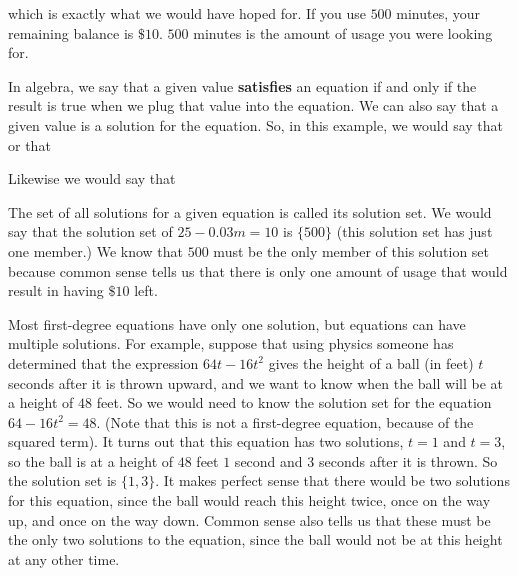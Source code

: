 which is exactly what we would have hoped for. If you use $500$ minutes, your remaining balance is $\$10$. $500$ minutes is the amount of usage you were looking for.

In algebra, we say that a given value \textbf{satisfies}  an equation if and only if the result is true when we plug that value into the equation. We can also say that a given value is a solution for the equation. So, in this example, we would say that  or that 

Likewise we would say that 

The set of all solutions for a given equation is called its solution set. We would say that the solution set of $25 - 0.03m = 10$ is $\{500\}$ (this solution set has just one member.)  We know that $500$ must be the only member of this solution set because common sense tells us that there is only one amount of usage that would result in having $\$10$ left.

Most first-degree equations have only one solution, but equations can have multiple solutions. For example, suppose that using physics someone has determined that the expression $64t - 16t^2$ gives the height of a ball (in feet) $t$ seconds after it is thrown upward, and we want to know when the ball will be at a height of $48$ feet. So we would need to know the solution set for the equation $64-16t^2 = 48$. (Note that this is not a first-degree equation, because of the squared term). It turns out that this equation has two solutions, $t=1$ and $t=3$, so the ball is at a height of $48$ feet $1$ second and $3$ seconds after it is thrown. So the solution set is $\{1,3\}$. It makes perfect sense that there would be two solutions for this equation, since the ball would reach this height twice, once on the way up, and once on the way down. Common sense also tells us that these must be the only two solutions to the equation, since the ball would not be at this height at any other time.


